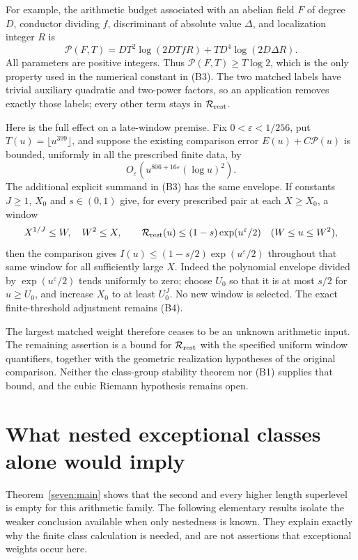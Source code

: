 \documentclass[11pt]{article}
\begin{document}
For example, the arithmetic budget associated with an abelian field $F$ of degree $D$, conductor dividing $f$, discriminant of absolute value $\Delta$, and localization integer $R$ is
\[
 \mathcal P(F,T)=DT^2\log(2DTfR)+TD^4\log(2D\Delta R).
\]
All parameters are positive integers. Thus $\mathcal P(F,T)\ge T\log2$, which is the only property used in the numerical constant in (B3). The two matched labels have trivial auxiliary quadratic and two-power factors, so an application removes exactly those labels; every other term stays in $\mathcal R_{\rm rest}$.

Here is the full effect on a late-window premise. Fix $0<\varepsilon<1/256$, put $T(u)=\lfloor u^{399}\rfloor$, and suppose the existing comparison error $E(u)+C\mathcal P(u)$ is bounded, uniformly in all the prescribed finite data, by
\[
 O_\varepsilon\!\left(u^{806+16\varepsilon}(\log u)^2\right).
\]
The additional explicit summand in (B3) has the same envelope. If constants $J\ge1$, $X_0$ and $s\in(0,1)$ give, for every prescribed pair at each $X\ge X_0$, a window
\[
 X^{1/J}\le W,\quad W^2\le X,\qquad
 \mathcal R_{\rm rest}(u)\le(1-s)\exp(u^\varepsilon/2)
 \quad(W\le u\le W^2),
\]
then the comparison gives $I(u)\le(1-s/2)\exp(u^\varepsilon/2)$ throughout that same window for all sufficiently large $X$. Indeed the polynomial envelope divided by $\exp(u^\varepsilon/2)$ tends uniformly to zero; choose $U_0$ so that it is at most $s/2$ for $u\ge U_0$, and increase $X_0$ to at least $U_0^J$. No new window is selected. The exact finite-threshold adjustment remains (B4).

The largest matched weight therefore ceases to be an unknown arithmetic input. The remaining assertion is a bound for $\mathcal R_{\rm rest}$ with the specified uniform window quantifiers, together with the geometric realization hypotheses of the original comparison. Neither the class-group stability theorem nor (B1) supplies that bound, and the cubic Riemann hypothesis remains open.


\section{What nested exceptional classes alone would imply}
Theorem~\ref{seven:main} shows that the second and every higher length superlevel is empty for this arithmetic family. The following elementary results isolate the weaker conclusion available when only nestedness is known. They explain exactly why the finite class calculation is needed, and are not assertions that exceptional weights occur here.
\end{document}

